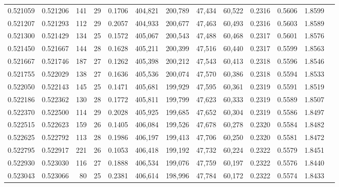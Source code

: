 \begin{tabular}{rrrrrrrrrrrrr}
0.521059 & 0.521206 &    141 &    29 &                                     0.1706 & 404,821 & 200,789 &  47,434 &  60,522 & 0.2316 & 0.5606 & 1.8599 \\
0.521207 & 0.521293 &    112 &    29 &                                     0.2057 & 404,933 & 200,677 &  47,463 &  60,493 & 0.2316 & 0.5603 & 1.8589 \\
0.521300 & 0.521429 &    134 &    25 &                                     0.1572 & 405,067 & 200,543 &  47,488 &  60,468 & 0.2317 & 0.5601 & 1.8576 \\
0.521450 & 0.521667 &    144 &    28 &                                     0.1628 & 405,211 & 200,399 &  47,516 &  60,440 & 0.2317 & 0.5599 & 1.8563 \\
0.521667 & 0.521746 &    187 &    27 &                                     0.1262 & 405,398 & 200,212 &  47,543 &  60,413 & 0.2318 & 0.5596 & 1.8546 \\
0.521755 & 0.522029 &    138 &    27 &                                     0.1636 & 405,536 & 200,074 &  47,570 &  60,386 & 0.2318 & 0.5594 & 1.8533 \\
0.522050 & 0.522143 &    145 &    25 &                                     0.1471 & 405,681 & 199,929 &  47,595 &  60,361 & 0.2319 & 0.5591 & 1.8519 \\
0.522186 & 0.522362 &    130 &    28 &                                     0.1772 & 405,811 & 199,799 &  47,623 &  60,333 & 0.2319 & 0.5589 & 1.8507 \\
0.522370 & 0.522500 &    114 &    29 &                                     0.2028 & 405,925 & 199,685 &  47,652 &  60,304 & 0.2319 & 0.5586 & 1.8497 \\
0.522515 & 0.522623 &    159 &    26 &                                     0.1405 & 406,084 & 199,526 &  47,678 &  60,278 & 0.2320 & 0.5584 & 1.8482 \\
0.522625 & 0.522792 &    113 &    28 &                                     0.1986 & 406,197 & 199,413 &  47,706 &  60,250 & 0.2320 & 0.5581 & 1.8472 \\
0.522795 & 0.522917 &    221 &    26 &                                     0.1053 & 406,418 & 199,192 &  47,732 &  60,224 & 0.2322 & 0.5579 & 1.8451 \\
0.522930 & 0.523030 &    116 &    27 &                                     0.1888 & 406,534 & 199,076 &  47,759 &  60,197 & 0.2322 & 0.5576 & 1.8440 \\
0.523043 & 0.523066 &     80 &    25 &                                     0.2381 & 406,614 & 198,996 &  47,784 &  60,172 & 0.2322 & 0.5574 & 1.8433 \\

\end{tabular}
